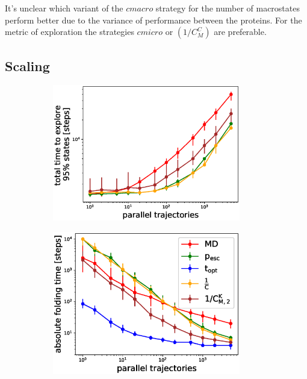 It's unclear which variant of the $cmacro$ strategy for the number of macrostates perform better due to the variance of performance between the proteins. For the metric of exploration the strategies $cmicro$ or  $(1/C_M^C)$ are preferable. 

\subsection{\label{sec:scaling}Scaling}

\begin{figure}[H]
  \begin{subfigure}[t]{0.5\textwidth}
    \includegraphics[width=0.9\textwidth]{figures/1FME_6_steps10000_scaling_explore_total.eps}   
  \end{subfigure}
  \begin{subfigure}[t]{0.5\textwidth}
    \includegraphics[width=0.9\textwidth]{figures/GTT_6_steps10000_scaling_fold0.eps}    

\end{subfigure}
\end{figure}
